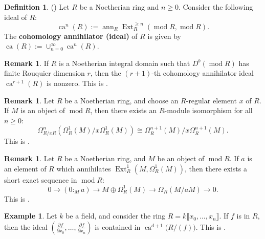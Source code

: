 \documentclass[11pt]{amsart}
\theoremstyle{plain}
\theoremstyle{definition}
\newtheorem{definition}[theorem]{Definition}
\newtheorem{example}[theorem]{Example}
\newtheorem{remark}[theorem]{Remark}
\numberwithin{equation}{section}
\numberwithin{theorem}{section}
\begin{document}
\begin{definition}(\cite[Definition 2.1]{Iyengar/Takahashi:2016})
    Let $R$ be a Noetherian ring and $n\geq0$. Consider the following ideal of $R$:
    \begin{displaymath}
        \operatorname{ca}^n (R):= \operatorname{ann}_R\operatorname{Ext}^{\geq n}_R (\operatorname{mod}R,\operatorname{mod}R).
    \end{displaymath}
    The \textbf{cohomology annihilator (ideal)} of $R$ is given by $\operatorname{ca}(R) := \cup^\infty_{n=0}\operatorname{ca}^n (R)$.
\end{definition}

\begin{remark}\label{rmk:Rouquier_dim_cohomology_annihilator_nonzero}
    If $R$ is a Noetherian integral domain such that $D^b (\operatorname{mod}R)$ has finite Rouquier dimension $r$, then the $(r+1)$-th cohomology annihilator ideal $\operatorname{ca}^{r+1} (R)$ is nonzero. This is \cite[Theorem 5]{Elagin/Lunts:2018}.
\end{remark}

\begin{remark}\label{rmk:regular_element_syzygy_quotient}
    Let $R$ be a Noetherian ring, and choose an $R$-regular element $x$ of $R$. If $M$ is an object of $\operatorname{mod}R$, then there exists an $R$-module isomorphism for all $n\geq 0$:
    \begin{displaymath}
        \Omega_{R/xR}^n (\Omega^1_R (M)/ x\Omega^1_R (M)) \cong \Omega_R^{n+1} (M)/ x \Omega_R^{n+1} (M).
    \end{displaymath}
    This is \cite[Lemma 5.6]{Dao/Takahashi:2014}.
\end{remark}

\begin{remark}\label{rmk:ses_cohomology_annihilator}
    Let $R$ be a Noetherian ring, and $M$ be an object of $\operatorname{mod}R$. If $a$ is an element of $R$ which annihilates $\operatorname{Ext}_R^1(M,\Omega^1_R (M))$, then there exists a short exact sequence in $\operatorname{mod}R$:
    \begin{displaymath}
        0 \to (0:_M a) \to M \oplus \Omega^1_R (M) \to \Omega_R (M/a M) \to 0.
    \end{displaymath}
    This is \cite[Remark 2.12]{Iyengar/Takahashi:2016}.
\end{remark}

\begin{example}\label{ex:Dieterich_hypersurface_cohomology_annihilator}
    Let $k$ be a field, and consider the ring $R=k \llbracket  x_0,\ldots,x_n \rrbracket  $. If $f$ is in $R$, then the ideal $(\frac{\partial f}{\partial x_0}, \ldots, \frac{\partial f}{\partial x_n})$ is contained in $\operatorname{ca}^{d+1} \big(R/(f) \big)$. This is \cite[Proposition 18]{Dieterich/1987}.
\end{example}
\end{document}
